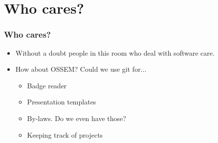\documentclass{beamer}
\begin{document}
\section{Who cares?}
\begin{frame}
    \frametitle{Who cares?}
    \begin{itemize}
        \item{Without a doubt people in this room who deal with software care.}
        \item{How about OSSEM? Could we use git for...}
            \begin{itemize}
                \item{Badge reader}
                \item{Presentation templates}
                \item{By-laws. Do we even have those?}
                \item{Keeping track of projects}
            \end{itemize}
    \end{itemize}
\end{frame}
\end{document}
